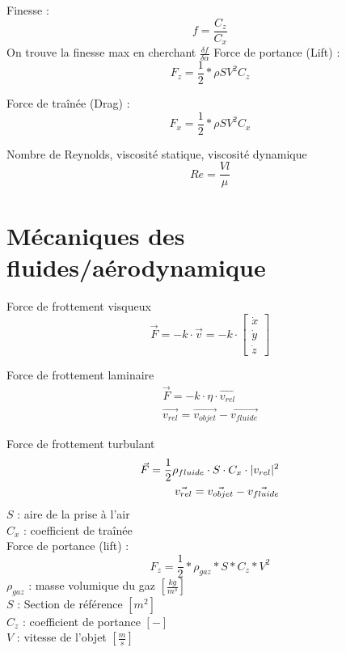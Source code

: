 \documentclass[12pt,a4paper,twoside]{article}
\numberwithin{equation}{subsection}
\DeclarePairedDelimiter{\abs}{\lvert}{\rvert}
\begin{document}
Finesse :
\begin{equation}
f=\frac{C_z}{C_x}
\end{equation}
On trouve la finesse max en cherchant $\frac{\delta f}{\delta \alpha}$
Force de portance (Lift) :
\begin{equation}
F_z= \frac{1}{2}*\rho S V^2 C_z
\end{equation}

Force de traînée (Drag) : 
\begin{equation}
F_x= \frac{1}{2}*\rho S V^2 C_x
\end{equation}

Nombre de Reynolds, viscosité statique, viscosité dynamique
\begin{equation}
Re=\frac{V l}{\mu}
\end{equation}

\newpage
\section{Mécaniques des fluides/aérodynamique}
Force de frottement visqueux
\begin{equation}
\vec{F}=-k\cdot \vec{v}=-k\cdot 
\begin{bmatrix}
\dot{x} \\
\dot{y}\\
\dot{z}
\end{bmatrix}
\end{equation}

Force de frottement laminaire
\begin{eqnarray}
\vec{F}=-k \cdot \eta \cdot \vec{v_{rel}}\\
\vec{v_{rel}}=\vec{v_{objet}}-\vec{v_{fluide}}
\end{eqnarray}

Force de frottement turbulant
\begin{eqnarray}
\vec{F}= \frac{1}{2} \rho_{fluide} \cdot S \cdot C_x \cdot \abs{v_{rel}}^2\\
\vec{v_{rel}}=\vec{v_{objet}}-\vec{v_{fluide}}
\end{eqnarray}
$S$ : aire de la prise à l'air \\
$C_x$ : coefficient de traînée\\


Force de portance (lift) :
\begin{equation}
F_z=\frac{1}{2}*\rho_{gaz}*S*C_z*V^2
\end{equation}
$\rho_{gaz}$ : masse volumique du gaz $[\frac{kg}{m^3}]$\\
$S$ : Section de référence $[m^2]$\\
$C_z$ : coefficient de portance $[-]$\\
$V$ : vitesse de l'objet $[\frac{m}{s}]$\\
\end{document}
